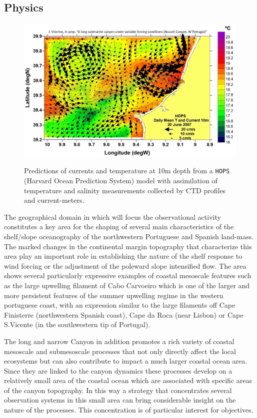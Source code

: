 \subsection{Physics}

\begin{figure}
\vspace{-0.5cm}
  \centering
  \includegraphics[scale=0.40]{fig/model.jpeg}
  \label{fig:model}
  \caption{Predictions of currents and temperature at 10m depth from
  a \texttt{HOPS} (Harvard Ocean Prediction System) model with
  assimilation of temperature and salinity measurements collected by
  CTD profiles and current-meters.}
\vspace{-0.5cm}
\end{figure}

The geographical domain in which \proj will focus the observational
activity constitutes a key area for the shaping of several main
characteristics of the shelf/slope oceanography of the northwestern
Portuguese and Spanish land-mass. The marked changes in the
continental margin topography that characterize this area play an
important role in establishing the nature of the shelf response to
wind forcing or the adjustment of the poleward slope intensified
flow. The area shows several particularly expressive examples of
coastal mesoscale features such as the large upwelling filament of
Cabo Carvoeiro which is one of the larger and more persistent features
of the summer upwelling regime in the western portuguese coast, with
an expression similar to the large filaments off Cape Finisterre
(northwestern Spanish coast), Cape da Roca (near Lisbon) or Cape
S.Vicente (in the southwestern tip of Portugal).

The long and narrow \naz Canyon in addition promotes a rich variety of
coastal mesoscale and submesoscale processes that not only directly
affect the local ecosystems but can also contribute to impact a much
larger coastal ocean area. Since they are linked to the canyon
dynamics these processes develop on a relatively small area of the
coastal ocean which are associated with specific areas of the canyon
topography. In this way a strategy that concentrates several
observation systems in this small area can bring considerable insight
on the nature of the processes. This concentration is of particular
interest for \proj objectives. 
 
 